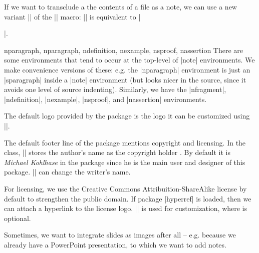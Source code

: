 \begin{function}{}
  If we want to transclude a the contents of a file as a note, we can use a new variant
  || of the || macro: || is equivalent to
  |\begin{note}\end{note}|.
\end{function}

\begin{environment}{nparagraph, nparagraph, ndefinition, nexample, nsproof, nassertion}
  There are some environments that tend to occur at the top-level of |note|
  environments. We make convenience versions of these: e.g. the |nparagraph| environment
  is just an |sparagraph| inside a |note| environment (but looks nicer in the source,
  since it avoids one level of source indenting). Similarly, we have the |nfragment|,
  |ndefinition|, |nexample|, |nsproof|, and |nassertion| environments.
\end{environment}

\begin{function} {\setslidelogo}
  The default logo provided by the  package is the {\sTeX} logo it can be
  customized using ||.
\end{function}

\begin{function}{\setsource}
  The default footer line of the  package mentions copyright and
  licensing. In the  class, |\source| stores the author's name as the
  copyright holder . By default it is \emph{Michael Kohlhase} in the 
  package since he is the main user and designer of this
  package. || can change the writer's name.
\end{function}

\begin{function}{\setlicensing}
  For licensing, we use the Creative Commons Attribuition-ShareAlike license by default to
  strengthen the public domain. If package |hyperref| is loaded, then we can attach a
  hyperlink to the license logo. || is used
  for customization, where  is optional.
\end{function}

Sometimes, we want to integrate slides as images after all -- e.g. because we already
have a PowerPoint presentation, to which we want to add \sTeX notes.

